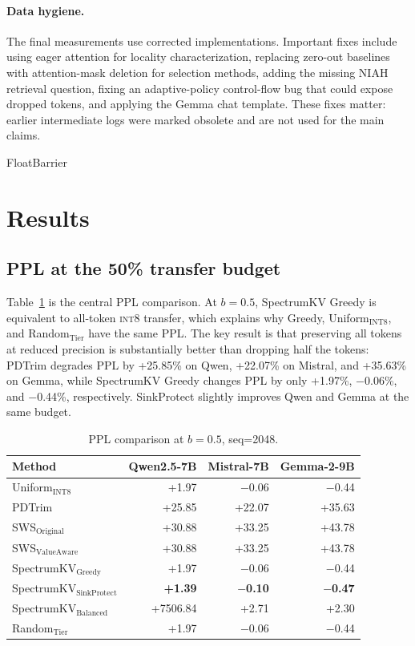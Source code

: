\documentclass[11pt]{article}
\newcommand{\method}{SpectrumKV}
\newcommand{\niah}{NIAH}
\newcommand{\budget}{b}
\newcommand{\pct}{\%}
\newcommand{\intviii}{\textsc{int8}}
\theoremstyle{plain}
\theoremstyle{definition}
\begin{document}
\paragraph{Data hygiene.}
The final measurements use corrected implementations.  Important fixes include using eager attention for locality characterization, replacing zero-out baselines with attention-mask deletion for selection methods, adding the missing \niah{} retrieval question, fixing an adaptive-policy control-flow bug that could expose dropped tokens, and applying the Gemma chat template.  These fixes matter: earlier intermediate logs were marked obsolete and are not used for the main claims.

FloatBarrier
\section{Results}
\label{sec:results}

\subsection{PPL at the 50\pct{} transfer budget}
\label{sec:rq7}

Table~\ref{tab:ppl50} is the central PPL comparison.  At $\budget=0.5$, \method{} Greedy is equivalent to all-token \intviii{} transfer, which explains why Greedy, Uniform$_{\text{INT8}}$, and Random$_{\text{Tier}}$ have the same PPL.  The key result is that preserving all tokens at reduced precision is substantially better than dropping half the tokens: PDTrim degrades PPL by +25.85\pct{} on Qwen, +22.07\pct{} on Mistral, and +35.63\pct{} on Gemma, while \method{} Greedy changes PPL by only +1.97\pct{}, $-$0.06\pct{}, and $-$0.44\pct{}, respectively.  SinkProtect slightly improves Qwen and Gemma at the same budget.

\begin{table}[t]
\centering
\caption{PPL comparison at $\budget=0.5$, seq=2048.}
\label{tab:ppl50}
\small
\begin{tabular}{lrrr}
\toprule
Method & Qwen2.5-7B & Mistral-7B & Gemma-2-9B \\
\midrule
Uniform$_{\text{INT8}}$ & +1.97 & $-$0.06 & $-$0.44 \\
PDTrim & +25.85 & +22.07 & +35.63 \\
SWS$_{\text{Original}}$ & +30.88 & +33.25 & +43.78 \\
SWS$_{\text{ValueAware}}$ & +30.88 & +33.25 & +43.78 \\
\method{}$_{\text{Greedy}}$ & +1.97 & $-$0.06 & $-$0.44 \\
\method{}$_{\text{SinkProtect}}$ & \textbf{+1.39} & \textbf{$-$0.10} & \textbf{$-$0.47} \\
\method{}$_{\text{Balanced}}$ & +7506.84 & +2.71 & +2.30 \\
Random$_{\text{Tier}}$ & +1.97 & $-$0.06 & $-$0.44 \\
\bottomrule
\end{tabular}
\end{table}
\end{document}
